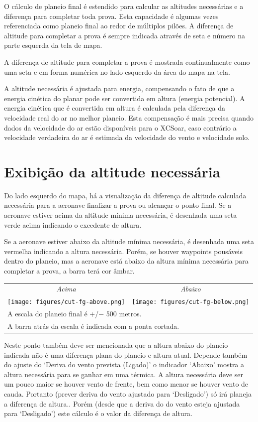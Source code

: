 O cálculo de planeio final é estendido para calcular as altitudes necessárias e a diferença para completar toda prova.  Esta capacidade é algumas vezes referenciada como planeio final ao redor de múltiplos pilões.  
A diferença de altitude para completar a prova é sempre indicada através de seta e número na parte esquerda da tela de mapa.

A diferença de altitude para completar a prova é mostrada continualmente como uma seta e em forma numérica no lado esquerdo da área do mapa na tela.

A altitude necessária é ajustada para energia, compensando o fato de que a energia cinética do planar pode ser convertida em altura (energia potencial).  A energia cinética que é convertida em altura é calculada pela diferença da velocidade real do ar no melhor planeio.  Esta compensação é mais precisa quando dados da velocidade do ar estão disponíveis para o XCSoar, caso contrário a velocidade verdadeira do ar é estimada da velocidade do vento e velocidade solo.


\section{Exibição da altitude necessária}

Do lado esquerdo do mapa, há a visualização da diferença de altitude calculada necessária para a aeronave finalizar a prova ou alcançar o ponto final.  Se a aeronave estiver acima da altitude mínima necessária, é desenhada uma seta verde acima indicando o excedente de altura.

Se a aeronave estiver abaixo da altitude mínima necessária, é desenhada uma seta vermelha indicando a altura necessária.  Porém, se houver waypoints pousáveis dentro do planeio, mas a aeronave está abaixo da altura mínima necessária para completar a prova, a barra terá cor âmbar.

\begin{center}
\begin{tabular}{c c}
{\it Acima} & {\it Abaixo} \\
\texttt{[image: figures/cut-fg-above.png]} &
\texttt{[image: figures/cut-fg-below.png]} \\
\multicolumn{2}{l}{A escala do planeio final é $+$/$-$ 500 metros.} \\
\multicolumn{2}{l}{A barra atrás da escala é indicada com a ponta cortada.}
\end{tabular}
\end{center}
\tip
Neste ponto também deve ser mencionada que a altura abaixo do planeio indicada não é uma diferença plana do planeio e altura atual.  Depende também do ajuste do ‘Deriva do vento prevista (Ligado)’ o indicador ‘Abaixo’ mostra a altura necessária para se ganhar em uma térmica.  
A altura necessária deve ser um pouco maior se houver vento de frente, bem como menor se houver vento de cauda.  Portanto (prever deriva do vento ajustado para ‘Desligado’) só irá planeja a diferença de altura..  Porém (desde que a deriva do do vento esteja ajustada para ‘Desligado’) este cálculo é o valor da diferença de altura.
 


